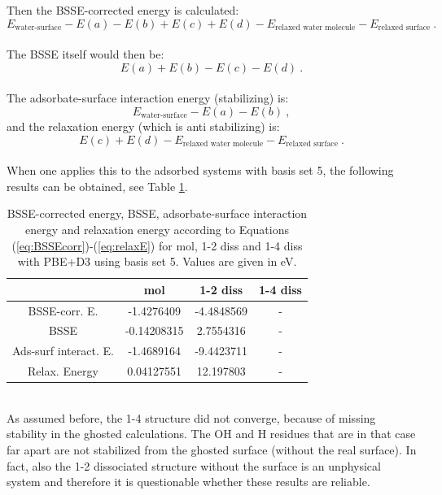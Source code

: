 \documentclass[11pt,DIV=13,BCOR=5mm,a4paper,headinclude]{scrbook}
\begin{document}
Then the BSSE-corrected energy is calculated:
\begin{equation}\label{eq:BSSEcorr}
 E_{\textrm{water-surface}}-E(a)-E(b)+E(c)+E(d)-E_{\textrm{relaxed water molecule}}-E_{\textrm{relaxed surface}} ~.
\end{equation}
\\
The BSSE itself would then be:
\begin{equation}
 E(a)+E(b)-E(c)-E(d) ~.
\end{equation}
\\
The adsorbate-surface interaction energy (stabilizing) is:
\begin{equation}
 E_{\textrm{water-surface}}-E(a)-E(b) ~,
\end{equation}
and the relaxation energy (which is anti stabilizing) is:
\begin{equation}\label{eq:relaxE}
 E(c)+E(d)-E_{\textrm{relaxed water molecule}}-E_{\textrm{relaxed surface}} ~.
\end{equation}
\\
When one applies this to the adsorbed systems with basis set 5, the following results can be obtained, see Table \ref{tab:bsse-results}.
\begin{table}[!h]
  \centering
   \caption{BSSE-corrected energy, BSSE, adsorbate-surface interaction energy and relaxation energy according to Equations (\ref{eq:BSSEcorr})-(\ref{eq:relaxE}) for mol, 1-2 diss and 1-4 diss with PBE+D3 using basis set 5.
Values are given in eV.}
  \begin{tabular}{c|ccc}
  \toprule
			& mol  & 1-2 diss & 1-4 diss \\\midrule
  BSSE-corr. E.		&-1.4276409 &-4.4848569 & -\\
  BSSE			&-0.14208315&2.7554316 & -\\
  Ads-surf interact. E.	&-1.4689164 &-9.4423711 & -\\
  Relax. Energy		&0.04127551 &12.197803 & -\\\bottomrule
  \end{tabular}
  \label{tab:bsse-results}
 \end{table}
 \\
As assumed before, the 1-4 structure did not converge, because of missing stability in the ghosted calculations.
The OH and H residues that are in that case far apart are not stabilized from the ghosted surface (without the real surface).
In fact, also the 1-2 dissociated structure without the surface is an unphysical system and therefore it is questionable whether these results are reliable.
\end{document}
